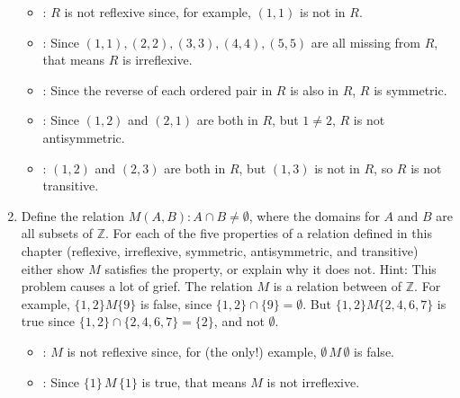\documentclass[11pt]{amsart}
\begin{document}
\begin{enumerate}
{\color{blue}
\begin{itemize}

\item {}: $R$ is not reflexive since, for example, $(1,1)$ is not in $R$.\\[3pt]

\item {}: Since $(1,1), (2,2), (3,3), (4,4), (5,5)$ are all missing from $R$, 
that means $R$ is irreflexive.\\[3pt]

\item{}: Since the reverse of each ordered pair in $R$ is also in $R$, $R$ is 
symmetric.\\[3pt]

\item{}: Since $(1,2)$ and $(2,1)$ are both in $R$, but $1\not=2$, $R$
is not antisymmetric.\\[3pt]

\item{}: $(1,2)$ and $(2,3)$ are both in $R$, but $(1,3)$ is not in $R$, 
so $R$ is not transitive.\\[5pt]

\end{itemize}
}
\vfill\break

\item Define the relation {\it $M(A,B) : A\cap B \not= \emptyset$}, where the
domains for $A$ and $B$ are all subsets of $\mathbb{Z}$. For each of the five properties of a 
relation defined in this chapter (reflexive, irreflexive, symmetric, antisymmetric, and transitive) 
either show $M$ satisfies the property, or explain why it does not.
\vskip 4pt
Hint: This problem causes a lot of grief. The relation $M$ is a relation between  
of $\mathbb{Z}$. For example, $\{1,2\} M \{ 9\}$ is false, since $\{1,2\}\cap \{9\} = \emptyset$. But 
$\{1,2\} M \{2,4,6,7\}$ is true since $\{1,2\} \cap \{2,4,6,7\} = \{2\}$, and not $\emptyset$.\\[5pt]
{\color{blue}
\begin{itemize}

\item {}: $M$ is not reflexive since, for (the only!)  example, $\emptyset\,M\,\emptyset$ is false.\\[3pt]

\item {}: Since $\{1\}\,M\,\{1\}$ is true, 
that means $M$ is not irreflexive.\\[3pt]


\end{itemize}}
\end{enumerate}
\end{document}
